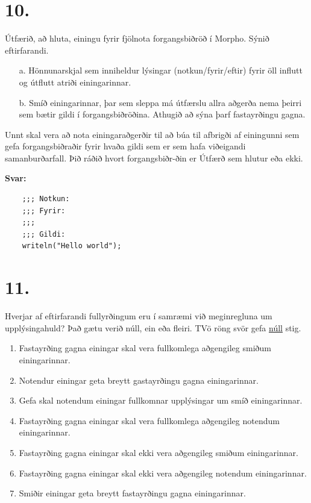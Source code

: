 \documentclass{article}
\newcommand{\sv}{\textbf{Svar:}}
\newcommand{\enum}{\begin{enumerate}[label = \alph*.]}
\begin{document}
     \section{10.}
     Útfærið, að hluta, einingu fyrir fjölnota forgangsbiðröð í Morpho.
     Sýnið eftirfarandi.
     \begin{itemize}
        \item[a.] Hönnunarskjal sem inniheldur lýsingar (notkun/fyrir/eftir) fyrir
                  öll influtt og útflutt atriði einingarinnar.
        \item[b.] Smíð einingarinnar, þar sem sleppa má útfærslu allra 
                  aðgerða nema þeirri sem bætir gildi í forgangsbiðröðina.
                  Athugið að sýna þarf fastayrðingu gagna.
                  
     \end{itemize}
     Unnt skal vera að nota einingaraðgerðir til að búa til afbrigði af 
     einingunni sem gefa forgangsbiðraðir fyrir hvaða gildi sem er sem
     hafa viðeigandi samanburðarfall. Þið ráðið hvort forgangsbiðr-ðin er
     Útfærð sem hlutur eða ekki.

     \sv





    \begin{lstlisting}
    ;;; Notkun:
    ;;; Fyrir:
    ;;;
    ;;; Gildi:
    writeln("Hello world");  
    \end{lstlisting}


    \newpage
    \section{11.}
    Hverjar af eftirfarandi fullyrðingum eru í samræmi við meginregluna um upplýsingahuld? 
    Það gætu verið núll, ein eða fleiri. TVö röng svör gefa \underline{núll} stig.

    \enum
    \item Fastayrðing gagna einingar skal vera fullkomlega aðgengileg smiðum einingarinnar.
    \item Notendur einingar geta breytt gastayrðingu gagna einingarinnar.
    \item Gefa skal notendum einingar fullkomnar upplýsingar um smíð einingarinnar.
    \item Fastayrðing gagna einingar skal vera fullkomlega aðgengileg notendum einingarinnar.
    \item Fastayrðing gagna einingar skal ekki vera aðgengileg smiðum einingarinnar.
    \item Fastayrðing gagna einingar skal ekki vera aðgengileg notendum einingarinnar.
    \item Smiðir einingar geta breytt fastayrðingu gagna einingarinnar.
\end{enumerate}
\end{document}
